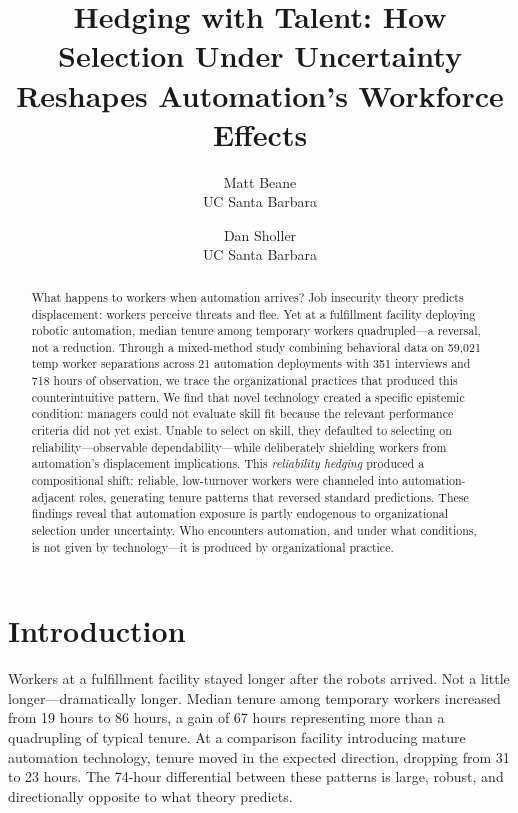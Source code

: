 \documentclass[12pt]{article}
\title{Hedging with Talent: How Selection Under Uncertainty Reshapes Automation's Workforce Effects}
\author{Matt Beane\\UC Santa Barbara \and Dan Sholler\\UC Santa Barbara}
\date{}
\begin{document}
\maketitle

\begin{abstract}
What happens to workers when automation arrives? Job insecurity theory predicts displacement: workers perceive threats and flee. Yet at a fulfillment facility deploying robotic automation, median tenure among temporary workers quadrupled---a reversal, not a reduction. Through a mixed-method study combining behavioral data on 59,021 temp worker separations across 21 automation deployments with 351 interviews and 718 hours of observation, we trace the organizational practices that produced this counterintuitive pattern. We find that novel technology created a specific epistemic condition: managers could not evaluate skill fit because the relevant performance criteria did not yet exist. Unable to select on skill, they defaulted to selecting on reliability---observable dependability---while deliberately shielding workers from automation's displacement implications. This \textit{reliability hedging} produced a compositional shift: reliable, low-turnover workers were channeled into automation-adjacent roles, generating tenure patterns that reversed standard predictions. These findings reveal that automation exposure is partly endogenous to organizational selection under uncertainty. Who encounters automation, and under what conditions, is not given by technology---it is produced by organizational practice.
\end{abstract}

\newpage

\section{Introduction}

Workers at a fulfillment facility stayed longer after the robots arrived. Not a little longer---dramatically longer. Median tenure among temporary workers increased from 19 hours to 86 hours, a gain of 67 hours representing more than a quadrupling of typical tenure. At a comparison facility introducing mature automation technology, tenure moved in the expected direction, dropping from 31 to 23 hours. The 74-hour differential between these patterns is large, robust, and directionally opposite to what theory predicts.
\end{document}
